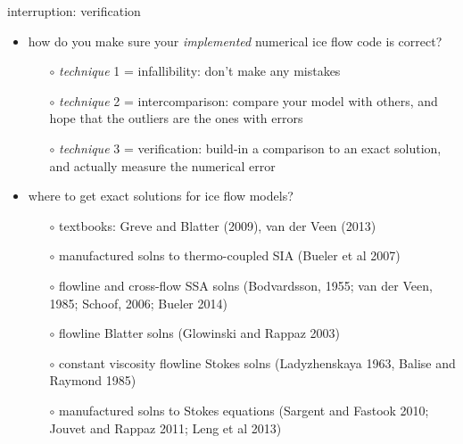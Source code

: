 \begin{frame}{interruption: verification}
\begin{itemize}
\item how do you make sure your \emph{implemented} numerical ice flow code is correct?
  \begin{itemize}
  \item[$\circ$] \emph{technique} 1 = \alert{infallibility}: don't make any mistakes
  \item[$\circ$] \emph{technique} 2 = \alert{intercomparison}: compare your model with others, and hope that the outliers are the ones with errors
  \item[$\circ$] \emph{technique} 3 = \alert{verification}: build-in a comparison to an exact solution, and actually measure the numerical error
  \end{itemize}

\medskip
\item where to get exact solutions for ice flow models?
  \begin{itemize}
  \item[$\circ$] textbooks: Greve and Blatter (2009), van der Veen (2013)
  \item[$\circ$] manufactured solns to thermo-coupled SIA (Bueler et al 2007)
  \item[$\circ$] flowline and cross-flow SSA solns (Bodvardsson, 1955; van der Veen, 1985; Schoof, 2006; Bueler 2014)
  \item[$\circ$] flowline Blatter solns (Glowinski and Rappaz 2003)
  \item[$\circ$] constant viscosity flowline Stokes solns (Ladyzhenskaya 1963, Balise and Raymond 1985)
  \item[$\circ$] manufactured solns to Stokes equations (Sargent and Fastook 2010; Jouvet and Rappaz 2011; Leng et al 2013)
  \end{itemize}
\end{itemize}
\end{frame}


